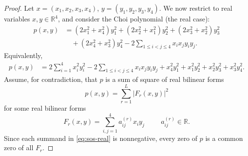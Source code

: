 \documentclass[12pt,a4paper]{amsart}
\theoremstyle{plain}
\theoremstyle{remark}
\theoremstyle{definition}
\def \R {\mathbb{R}}
\begin{document}
\begin{proof}
Let \(x=(x_1,x_2,x_3,x_4)\), \(y=(y_1,y_2,y_3,y_4)\). We now restrict to real variables \(x,y\in\mathbb R^4\), and consider the Choi polynomial (the real case):
\[
\begin{aligned}
p(x,y)%
& =  (2x_1^2+x_4^2)y_1^2+(2x_2^2+x_1^2)y_2^2 +(2x_3^2+x_2^2)y_3^2 \\
&\quad +(2x_4^2+x_3^2)y_4^2 -2\sum_{1\le i<j\le 4}x_i x_j y_i y_j.
\end{aligned}
\]
Equivalently,
\begin{equation}
\label{eq:p-real}
\begin{aligned}
p(x,y)
&=2\sum_{i=1}^4 x_i^2y_i^2
-2\sum_{1\le i<j\le 4}x_i x_j y_i y_j
+x_4^2y_1^2+x_1^2y_2^2+x_2^2y_3^2+x_3^2y_4^2.
\end{aligned}
\end{equation}
Assume, for contradiction, that $p$ is a sum of square of real bilinear forms 
\begin{equation}
\label{eq:sos-real}
p(x,y)=\sum_{r=1}^L |F_r(x,y)|^2
\end{equation}
for some real bilinear forms
\[
F_r(x,y)=\sum_{i,j=1}^4 a^{(r)}_{ij}x_i y_j \hspace{1cm} a^{(r)}_{ij} \in \R.
\]
Since each summand in \eqref{eq:sos-real} is nonnegative, every zero of \(p\) is a common zero of all \(F_r\).


\end{proof}
\end{document}
